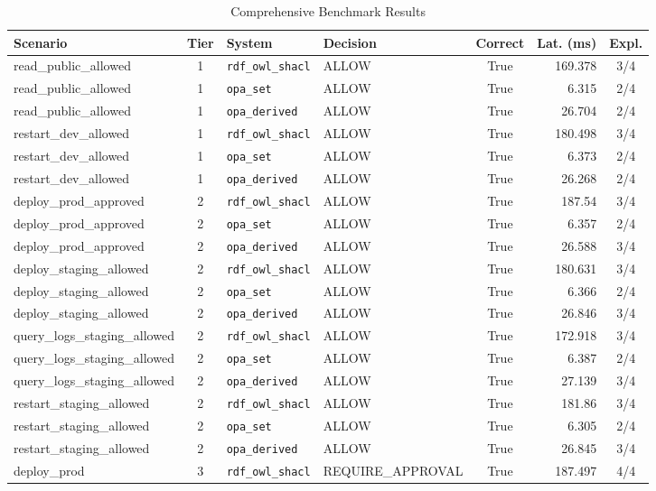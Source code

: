 \begin{table}[h!]
\centering
\caption{Comprehensive Benchmark Results}
\label{tab:benchmark_results}
\begin{tabular}{l c l l c r c}
\hline
Scenario & Tier & System & Decision & Correct & Lat. (ms) & Expl. \\
\hline
read\_public\_allowed & 1 & \texttt{rdf\_owl\_shacl} & ALLOW & True & 169.378 & 3/4 \\
read\_public\_allowed & 1 & \texttt{opa\_set} & ALLOW & True & 6.315 & 2/4 \\
read\_public\_allowed & 1 & \texttt{opa\_derived} & ALLOW & True & 26.704 & 2/4 \\
restart\_dev\_allowed & 1 & \texttt{rdf\_owl\_shacl} & ALLOW & True & 180.498 & 3/4 \\
restart\_dev\_allowed & 1 & \texttt{opa\_set} & ALLOW & True & 6.373 & 2/4 \\
restart\_dev\_allowed & 1 & \texttt{opa\_derived} & ALLOW & True & 26.268 & 2/4 \\
deploy\_prod\_approved & 2 & \texttt{rdf\_owl\_shacl} & ALLOW & True & 187.54 & 3/4 \\
deploy\_prod\_approved & 2 & \texttt{opa\_set} & ALLOW & True & 6.357 & 2/4 \\
deploy\_prod\_approved & 2 & \texttt{opa\_derived} & ALLOW & True & 26.588 & 3/4 \\
deploy\_staging\_allowed & 2 & \texttt{rdf\_owl\_shacl} & ALLOW & True & 180.631 & 3/4 \\
deploy\_staging\_allowed & 2 & \texttt{opa\_set} & ALLOW & True & 6.366 & 2/4 \\
deploy\_staging\_allowed & 2 & \texttt{opa\_derived} & ALLOW & True & 26.846 & 3/4 \\
query\_logs\_staging\_allowed & 2 & \texttt{rdf\_owl\_shacl} & ALLOW & True & 172.918 & 3/4 \\
query\_logs\_staging\_allowed & 2 & \texttt{opa\_set} & ALLOW & True & 6.387 & 2/4 \\
query\_logs\_staging\_allowed & 2 & \texttt{opa\_derived} & ALLOW & True & 27.139 & 3/4 \\
restart\_staging\_allowed & 2 & \texttt{rdf\_owl\_shacl} & ALLOW & True & 181.86 & 3/4 \\
restart\_staging\_allowed & 2 & \texttt{opa\_set} & ALLOW & True & 6.305 & 2/4 \\
restart\_staging\_allowed & 2 & \texttt{opa\_derived} & ALLOW & True & 26.845 & 3/4 \\
deploy\_prod & 3 & \texttt{rdf\_owl\_shacl} & REQUIRE_APPROVAL & True & 187.497 & 4/4 \\

\end{tabular}
\end{table}
